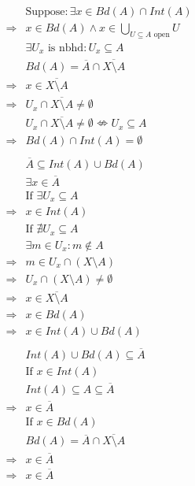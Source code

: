 \documentclass{article}
\begin{document}
\begin{equation*}
    \begin{split}
        &\text{Suppose}:\exists x\in Bd(A)\cap Int(A)\\
        \Rightarrow&x\in Bd(A)\land x\in \bigcup_{U\subseteq A\text{ open}}U\\
        &\exists U_x\text{ is nbhd}:U_x\subseteq A\\
        &Bd(A)=\overline{A}\cap\overline{X\setminus A}\\
        \Rightarrow&x\in \overline{X\setminus A}\\
        \Rightarrow&U_x\cap \overline{X\setminus A}\ne \emptyset\\
        &U_x\cap \overline{X\setminus A}\ne \emptyset\nLeftrightarrow U_x\subseteq A\\
        \Rightarrow&Bd(A)\cap Int(A)=\emptyset\\
        &\\
        &\overline{A}\subseteq Int(A)\cup Bd(A)\\
        &\exists x\in \overline{A}\\
        &\text{If } \exists U_x\subseteq A\\
        \Rightarrow&x\in Int(A)\\
        &\text{If } \nexists U_x\subseteq A\\
        &\exists m \in U_x:m\notin A\\
        \Rightarrow&m\in U_x\cap(X\setminus A)\\
        \Rightarrow&U_x\cap(X\setminus A)\ne\emptyset\\
        \Rightarrow&x\in \overline{X\setminus A}\\
        \Rightarrow&x\in Bd(A)\\
        \Rightarrow&x\in Int(A)\cup Bd(A)\\
        &\\
        &Int(A)\cup Bd(A)\subseteq \overline{A}\\
        &\text{If }x\in Int(A)\\
        &Int(A)\subseteq A\subseteq \overline{A}\\
        \Rightarrow&x\in\overline{A}\\
        &\text{If }x\in Bd(A)\\
        &Bd(A)=\overline{A}\cap\overline{X\setminus A}\\
        \Rightarrow&x\in\overline{A}\\
        \Rightarrow&x\in \overline{A}\\
    \end{split}
\end{equation*}
\end{document}
